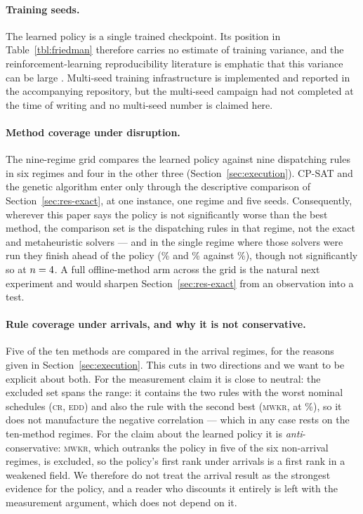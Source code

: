 \documentclass[a4paper,fleqn]{cas-sc}
\begin{document}
\paragraph{Training seeds.} The learned policy is a single trained checkpoint.
Its position in Table~\ref{tbl:friedman} therefore carries no estimate of
training variance, and the reinforcement-learning reproducibility literature is
emphatic that this variance can be large \citep{henderson2018,agarwal2021}.
Multi-seed training infrastructure is implemented and reported in the
accompanying repository, but the multi-seed campaign had not completed at the
time of writing and no multi-seed number is claimed here.

\paragraph{Method coverage under disruption.} The nine-regime grid compares the
learned policy against nine dispatching rules in six regimes and four in the
other three (Section~\ref{sec:execution}). CP-SAT and the genetic algorithm enter
only through the descriptive comparison of Section~\ref{sec:res-exact}, at one
instance, one regime and five seeds. Consequently, wherever this paper says the
policy is not significantly worse than the best method, the comparison set is the
dispatching rules in that regime, not the exact and metaheuristic solvers ---
and in the single regime where those solvers were run they finish ahead of the
policy (\QCpsat{}\% and \QGa{}\% against \QRl{}\%), though not significantly so
at $n=4{}$. A full offline-method arm across the grid is the natural
next experiment and would sharpen Section~\ref{sec:res-exact} from an
observation into a test.

\paragraph{Rule coverage under arrivals, and why it is not conservative.} Five
of the ten methods are compared in the arrival regimes, for the reasons given in
Section~\ref{sec:execution}. This cuts in two directions and we want to be
explicit about both. For the measurement claim it is close to neutral: the
excluded set spans the range: it contains the two rules with the worst nominal
schedules (\textsc{cr}, \textsc{edd}) and also the rule with the second best
(\textsc{mwkr}, at \NomMwkrTwo{}\%), so it does not manufacture the negative
correlation --- which in any case rests on the \NConfRegimes{} ten-method
regimes. For the claim about
the learned policy it is \emph{anti}-conservative: \textsc{mwkr}, which
outranks the policy in five of the six non-arrival regimes, is excluded, so the policy's first rank
under arrivals is a first rank in a weakened field. We therefore do not treat
the arrival result as the strongest evidence for the policy, and a reader who
discounts it entirely is left with the measurement argument, which does not
depend on it.
\end{document}
